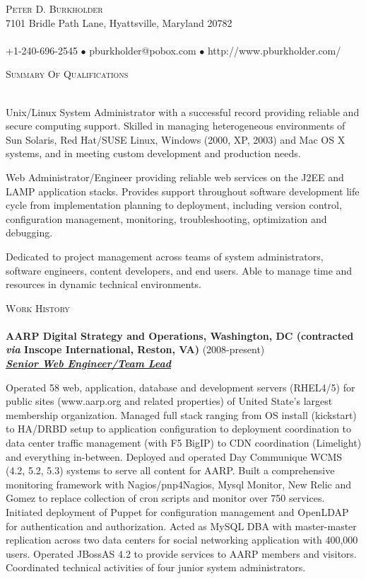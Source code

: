 \documentclass{article}
\newcommand{\lineunder}{\vspace*{-8pt} \\ \hspace*{-18pt} \hrulefill \\}
\newcommand{\header}[1]{{\hspace*{-15pt}\vspace*{6pt} \textsc{#1}} \vspace*{-6pt} \lineunder}
\newcommand{\employer}[3]{{ \textbf{#1} (#2)\\ \underline{\textbf{\emph{#3}}}\\ \nopagebreak }}
\newcommand{\contact}[3]{
    \vspace*{-8pt}
    \begin{center}
        {\LARGE \scshape {#1}}\\
        #2 \lineunder 
        #3
    \end{center}
    \vspace*{-8pt}
}
\newenvironment{achievements}{\begin{list}{\topsep 0pt \itemsep -2pt}} {\vspace*{4pt}\end{list}}
\begin{document}
\smallskip
\vspace*{-44pt}

\contact{Peter D. Burkholder}
{7101 Bridle Path Lane, Hyattsville, Maryland 20782}
{+1-240-696-2545 $\bullet$ pburkholder@pobox.com  $\bullet$ http://www.pburkholder.com/}

\header{Summary Of Qualifications}
\begin{achievements}
    \item Unix/Linux System Administrator with a successful record providing reliable and secure computing support.  Skilled in managing heterogeneous environments of Sun Solaris, Red Hat/SUSE Linux, Windows (2000, XP, 2003) and Mac OS X systems, and in meeting custom development and production needs.
    \item Web Administrator/Engineer providing reliable web services on the J2EE and LAMP application stacks.  Provides support throughout software development life cycle from implementation planning to deployment, including version control, configuration management, monitoring, troubleshooting, optimization and debugging.
    \item Dedicated to project management across teams of system administrators, software engineers, content developers, and end users.  Able to manage time and resources in dynamic technical environments.
\end{achievements}

\header{Work History}
\employer{AARP Digital Strategy and Operations, Washington, DC (contracted \emph{via} Inscope International, Reston, VA)}{2008-present}{Senior Web Engineer/Team Lead}
\begin{achievements}
  \item Operated 58 web, application, database and development servers (RHEL4/5) for public sites (www.aarp.org and related properties) of United State's largest membership organization.  Managed full stack ranging from OS install (kickstart) to HA/DRBD setup to application configuration to deployment coordination to data center traffic management (with F5 BigIP) to CDN coordination (Limelight) and everything in-between.  Deployed and operated Day Communique WCMS (4.2, 5.2, 5.3) systems to serve all content for AARP.  Built a comprehensive monitoring framework with Nagios/pnp4Nagios, Mysql Monitor, New Relic and Gomez to replace collection of cron scripts and monitor over 750 services.  Initiated deployment of Puppet for configuration management and OpenLDAP for authentication and authorization.  Acted as MySQL DBA with master-master replication across two data centers for social networking application with 400,000 users.  Operated JBossAS 4.2 to provide services to AARP members and visitors.  Coordinated technical activities of four junior system administrators.
\end{achievements}
\end{document}
